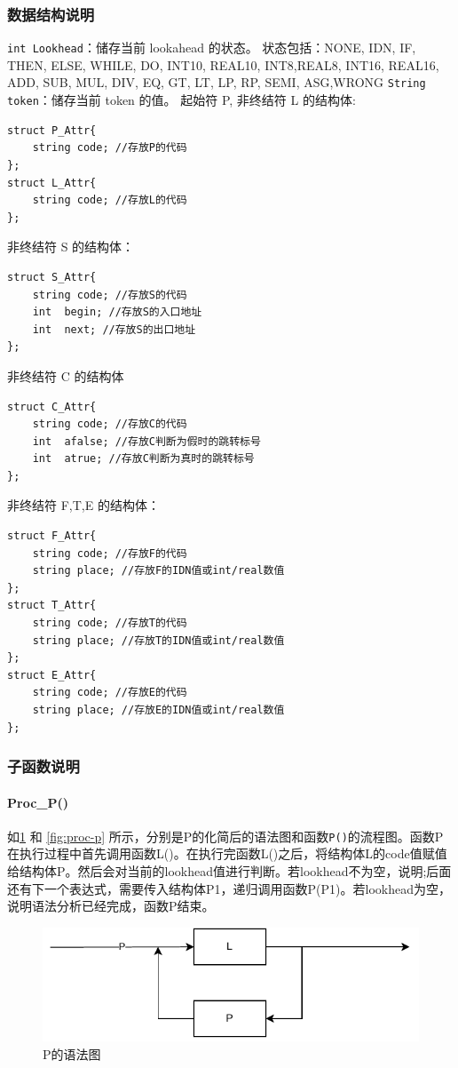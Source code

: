 \documentclass{ctexrep}
\begin{document}
\subsubsection{数据结构说明}
\begin{outline}[enumerate]
    \1 \texttt{int Lookhead}：储存当前 lookahead 的状态。
        状态包括：NONE, IDN, IF, THEN, ELSE, WHILE, DO, INT10, REAL10, INT8,REAL8, INT16, REAL16, ADD, SUB, MUL, DIV, EQ, GT, LT, LP, RP, SEMI, ASG,WRONG
    \1 \texttt{String token}：储存当前 token 的值。
    \1 起始符 P, 非终结符 L 的结构体:
\begin{verbatim}
struct P_Attr{
    string code; //存放P的代码
};
struct L_Attr{
    string code; //存放L的代码
};
\end{verbatim}
    \1 非终结符 S 的结构体：
\begin{verbatim}
struct S_Attr{
    string code; //存放S的代码
    int  begin; //存放S的入口地址
    int  next; //存放S的出口地址
};
\end{verbatim}
    \1 非终结符 C 的结构体
\begin{verbatim}
struct C_Attr{
    string code; //存放C的代码
    int  afalse; //存放C判断为假时的跳转标号
    int  atrue; //存放C判断为真时的跳转标号
};
\end{verbatim}
    \1 非终结符 F,T,E 的结构体：
\begin{verbatim}
struct F_Attr{
    string code; //存放F的代码
    string place; //存放F的IDN值或int/real数值
};
struct T_Attr{
    string code; //存放T的代码
    string place; //存放T的IDN值或int/real数值
};
struct E_Attr{
    string code; //存放E的代码
    string place; //存放E的IDN值或int/real数值
};
\end{verbatim}
\end{outline}
\subsubsection{子函数说明}
\paragraph{Proc\_P()}
如\cref{fig:p} 和 \cref{fig:proc-p} 所示，分别是P的化简后的语法图和函数\texttt{P()}的流程图。函数P在执行过程中首先调用函数L()。在执行完函数L()之后，将结构体L的code值赋值给结构体P。然后会对当前的lookhead值进行判断。若lookhead不为空，说明;后面还有下一个表达式，需要传入结构体P1，递归调用函数P(P1)。若lookhead为空，说明语法分析已经完成，函数P结束。

\begin{figure}[htp]
    \centering
    \includegraphics[width = .4\linewidth]{p.drawio.pdf}
    \caption{P的语法图}
    \label{fig:p}
\end{figure}
\end{document}
